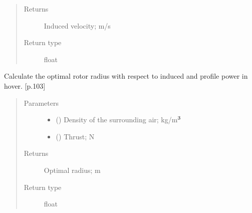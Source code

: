 \documentclass[letterpaper,10pt,english]{sphinxmanual}
\begin{document}
\begin{fulllineitems}
\begin{fulllineitems}
\begin{quote}
\begin{description}
\begin{itemize}
\end{itemize}

\item[{Returns}] \leavevmode
\sphinxAtStartPar
Induced velocity; m/s

\item[{Return type}] \leavevmode
\sphinxAtStartPar
float

\end{description}\end{quote}

\end{fulllineitems}


\begin{fulllineitems}
\label{\detokenize{modules/rotor:rotor.Rotor.get_min_power_radius}}
\sphinxAtStartPar
Calculate the optimal rotor radius with respect to induced and profile
power in hover. {[}p.103{]}
\begin{quote}\begin{description}
\item[{Parameters}] \leavevmode\begin{itemize}
\item {} 
\sphinxAtStartPar
{} () \textendash{} Density of the surrounding air; kg/m\(\sp{\text{3}}\)

\item {} 
\sphinxAtStartPar
{} () \textendash{} Thrust; N

\end{itemize}

\item[{Returns}] \leavevmode
\sphinxAtStartPar
Optimal radius; m

\item[{Return type}] \leavevmode
\sphinxAtStartPar
float

\end{description}\end{quote}

\end{fulllineitems}



\end{fulllineitems}
\end{document}
